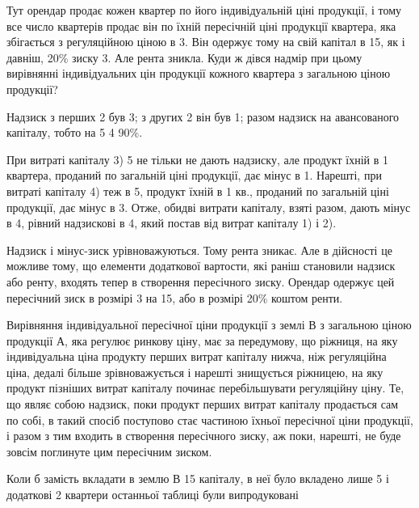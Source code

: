 \noindent{}Тут орендар продає кожен квартер по його індивідуальній ціні продукції,
і тому все число квартерів продає він по їхній пересічній ціні продукції квартера,
яка збігається з регуляційною ціною в 3. Він одержує тому на свій
капітал в 15, як і давніш, 20\% зиску \deq{} 3. Але рента зникла.
Куди ж дівся надмір при цьому вирівнянні індивідуальних цін продукції кожного
квартера з загальною ціною продукції?

Надзиск з перших 2 був 3; з других 2
він був 1; разом надзиск на   авансованого капіталу, тобто на
5 \deq{} 4 \deq{} 90\%.

При витраті капіталу 3) 5 не тільки не дають надзиску, але
продукт їхній в 1 квартера, проданий по загальній ціні продукції, дає мінус в
1. Нарешті, при витраті капіталу 4) теж в 5, продукт
їхній в 1 кв., проданий по загальній ціні продукції, дає мінус в 3. Отже,
обидві витрати капіталу, взяті разом, дають мінус в 4, рівний надзискові
в 4, який постав від витрат капіталу 1) і 2).

Надзиск і мінус-зиск урівноважуються. Тому рента зникає. Але в дійсності
це можливе тому, що елементи додаткової вартости, які раніш становили
надзиск або ренту, входять тепер в створення пересічного зиску. Орендар одержує
цей пересічний зиск в розмірі 3 на 15, або в розмірі
20\% коштом ренти.

Вирівняння індивідуальної пересічної ціни продукції з землі $В$ з загальною
ціною продукції $А$, яка регулює ринкову ціну, має за передумову, що ріжниця,
на яку індивідуальна ціна продукту перших витрат капіталу нижча,
ніж регуляційна ціна, дедалі більше зрівноважується і нарешті знищується
ріжницею, на яку продукт пізніших витрат капіталу починає перебільшувати
регуляційну ціну. Те, що являє собою надзиск, поки продукт перших витрат
капіталу продається сам по собі, в такий спосіб поступово стає частиною їхньої
пересічної ціни продукції, і разом з тим входить в створення пересічного зиску,
аж поки, нарешті, не буде зовсім поглинуте цим пересічним зиском.

Коли б замість вкладати в землю $В$ 15 капіталу, в неї було вкладено
лише 5 і додаткові 2 квартери останньої таблиці були випродуковані
\parbreak{}  %
